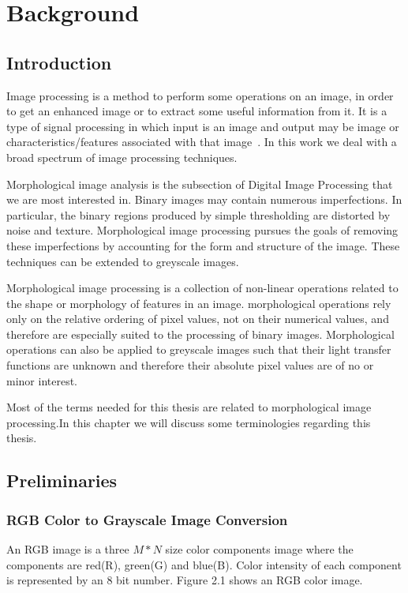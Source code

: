 \chapter{Background}\label{ch:term}

\section{Introduction}

Image processing is a method to perform some operations on an image, in order to get an enhanced image or to extract some useful information from it. It is a type of signal processing in which input is an image and output may be image or characteristics/features associated with that image~\cite{dip}. In this work we deal with a broad spectrum of image processing techniques.

Morphological image analysis is the subsection of Digital Image Processing that we are most interested in. Binary images may contain numerous imperfections. In particular, the binary regions produced by simple thresholding are distorted by noise and texture. Morphological image processing pursues the goals of removing these imperfections by accounting for the form and structure of the image. These techniques can be extended to greyscale images.

Morphological image processing is a collection of non-linear operations related to the shape or morphology of features in an image. morphological operations rely only on the relative ordering of pixel values, not on their numerical values, and therefore are especially suited to the processing of binary images. Morphological operations can also be applied to greyscale images such that their light transfer functions are unknown and therefore their absolute pixel values are of no or minor interest. 

Most of the terms needed for this thesis are related to morphological image processing.In this chapter we will discuss some terminologies regarding this thesis.

\section{Preliminaries}

\subsection{RGB Color to Grayscale Image Conversion}
An RGB image is a three $M*N$ size color components image where the components are red(R), green(G) and blue(B). Color intensity of each component is represented by an 8 bit number. Figure 2.1 shows an RGB color image.

